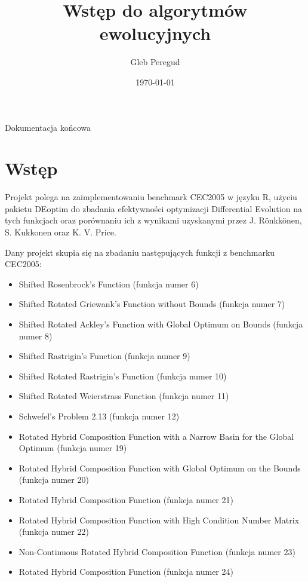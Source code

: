 \documentclass[11pt]{article}
\title{Wstęp do algorytmów ewolucyjnych}
\author{Gleb Peregud}
\date{\today}
\begin{document}
\maketitle

\setcounter{tocdepth}{3}
\tableofcontents
\vspace*{1cm}

Dokumentacja końcowa

\section{Wstęp}
\label{sec-1}


Projekt polega na zaimplementowaniu benchmark CEC2005 w języku R,
użyciu pakietu DEoptim do zbadania efektywności optymizacji
Differential Evolution na tych funkcjach oraz porównaniu ich z
wynikami uzyskanymi przez J. Rönkkönen, S. Kukkonen oraz K. V. Price.

Dany projekt skupia się na zbadaniu następujących funkcji z benchmarku
CEC2005:
\begin{itemize}
\item Shifted Rosenbrock’s Function (funkcja numer 6)
\item Shifted Rotated Griewank’s Function without Bounds (funkcja numer 7)
\item Shifted Rotated Ackley’s Function with Global Optimum on Bounds (funkcja numer 8)
\item Shifted Rastrigin’s Function (funkcja numer 9)
\item Shifted Rotated Rastrigin’s Function (funkcja numer 10)
\item Shifted Rotated Weierstrass Function (funkcja numer 11)
\item Schwefel’s Problem 2.13 (funkcja numer 12)
\item Rotated Hybrid Composition Function with a Narrow Basin for the
  Global Optimum (funkcja numer 19)
\item Rotated Hybrid Composition Function with Global Optimum on the
  Bounds (funkcja numer 20)
\item Rotated Hybrid Composition Function (funkcja numer 21)
\item Rotated Hybrid Composition Function with High Condition Number
  Matrix (funkcja numer 22)
\item Non-Continuous Rotated Hybrid Composition Function (funkcja numer 23)
\item Rotated Hybrid Composition Function (funkcja numer 24)
\end{itemize}
\end{document}

